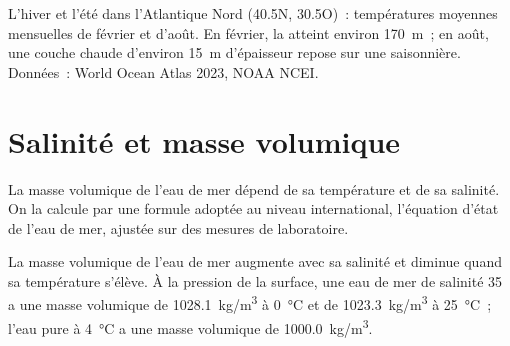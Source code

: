 \begin{omfigure}

{\small L'hiver et l'été dans l'Atlantique Nord (40.5\textdegree N,
30.5\textdegree O)~: températures moyennes mensuelles de février et d'août.
En février, la  atteint environ \qty{170}{m}~; en août, une
couche chaude d'environ \qty{15}{m} d'épaisseur repose sur une 
saisonnière. Données~: World Ocean Atlas 2023, NOAA NCEI.}
\end{omfigure}

\section{Salinité et masse volumique}

La masse volumique de l'eau de mer dépend de sa température et de sa
salinité. On la calcule par une formule adoptée au niveau international,
l'équation d'état de l'eau de mer, ajustée sur des mesures de laboratoire.

\begin{proposition}\label{prop:g10:layered-ocean:density}
La masse volumique de l'eau de mer augmente avec sa salinité et diminue
quand sa température s'élève. À la pression de la surface, une eau de mer de
salinité 35 a une masse volumique de \qty{1028.1}{kg/m^3} à
\qty{0}{\degreeCelsius} et de \qty{1023.3}{kg/m^3} à
\qty{25}{\degreeCelsius}~; l'eau pure à \qty{4}{\degreeCelsius} a une masse
volumique de \qty{1000.0}{kg/m^3}.
\end{proposition}

